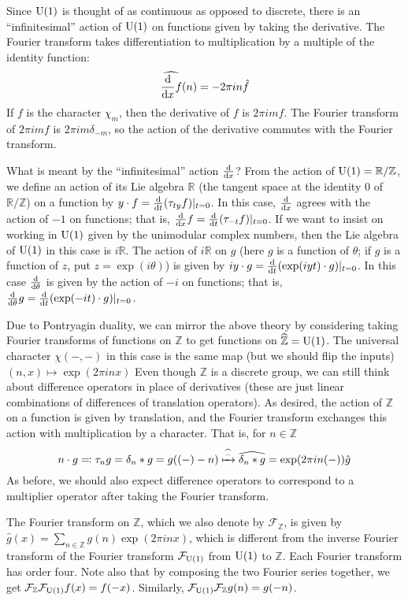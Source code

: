 \documentclass[../../rtnotes.tex]{subfiles}
\begin{document}
Since $\operatorname{U}(1)$ is thought of as continuous as opposed to discrete, there is an ``infinitesimal'' action of $\operatorname{U}(1)$ on functions given by taking the derivative. The Fourier transform takes differentiation to multiplication by a multiple of the identity function:
\[\widehat{\dv{x}f}(n) = -2\pi in\hat f\]
If $f$ is the character $\chi_m$, then the derivative of $f$ is $2\pi i m f$. The Fourier transform of $2\pi i m f$ is $2\pi i m \delta_{-m}$, so the action of the derivative commutes with the Fourier transform.

What is meant by the ``infinitesimal'' action $\dv{x}$? From the action of $\operatorname{U}(1) = \mathbb R/\mathbb Z$, we define an action of its Lie algebra $\mathbb R$ (the tangent space at the identity $0$ of $\mathbb R/\mathbb Z$) on a function by $y\cdot f = \dv{t}(\tau_{ty}f)|_{t=0}$. In this case, $\dv{x}$ agrees with the action of $-1$ on functions; that is, $\dv{x}f = \dv{t}(\tau_{-t}f)|_{t=0}$. If we want to insist on working in $\operatorname{U}(1)$ given by the unimodular complex numbers, then the Lie algebra of $\operatorname{U}(1)$ in this case is $i\mathbb R$. The action of $i\mathbb R$ on $g$ (here $g$ is a function of $\theta$; if $g$ is a function of $z$, put $z = \exp(i\theta)$) is given by $iy \cdot g = \dv{t}(\exp(iyt)\cdot g)|_{t=0}$. In this case $\dv{\theta}$ is given by the action of $-i$ on functions; that is, $\dv{\theta}g = \dv{t}(\exp(-it)\cdot g)|_{t=0}$.

Due to Pontryagin duality, we can mirror the above theory by considering taking Fourier transforms of functions on $\mathbb Z$ to get functions on $\widehat{\mathbb Z} = \operatorname{U}(1)$. The universal character $\chi(-,-)$ in this case is the same map (but we should flip the inputs) $(n,x)\mapsto \exp(2\pi inx)$ Even though $\mathbb Z$ is a discrete group, we can still think about difference operators in place of derivatives (these are just linear combinations of differences of translation operators). As desired, the action of $\mathbb Z$ on a function is given by translation, and the Fourier transform exchanges this action with multiplication by a character. That is, for $n\in\mathbb Z$
\[n\cdot g \eqqcolon \tau_ng = \delta_n\ast g = g((-)-n)\xmapsto{\widehat{-}}\widehat{\delta_n\ast g} = \exp(2\pi in(-)) \hat g\]
As before, we should also expect difference operators to correspond to a multiplier operator after taking the Fourier transform.

The Fourier transform on $\mathbb Z$, which we also denote by $\mathcal F_{\mathbb Z}$, is given by $\hat g(x) = \sum_{n\in \mathbb Z}g(n)\exp(2\pi i nx)$, which is different from the inverse Fourier transform of the Fourier transform $\mathcal F_{\operatorname{U}(1)}$ from $\operatorname{U}(1)$ to $\mathbb Z$. Each Fourier transform has order four. Note also that by composing the two Fourier series together, we get $\mathcal F_{\mathbb Z}\mathcal F_{\operatorname{U}(1)}f(x) = f(-x)$. Similarly, $\mathcal F_{\operatorname{U}(1)}\mathcal F_{\mathbb Z}g(n) = g(-n)$. 
\end{document}
